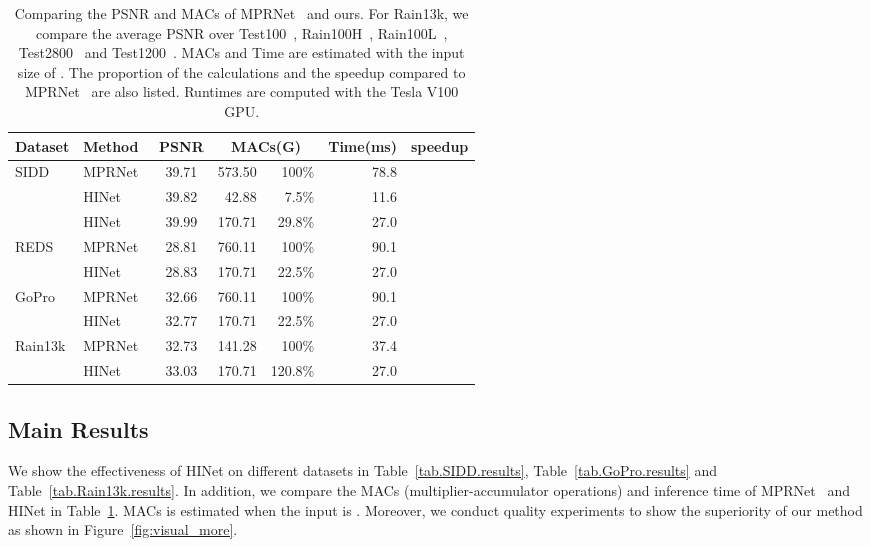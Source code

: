 \documentclass[final]{cvpr}
\newcommand{\tablestyle}[2]{\setlength{\tabcolsep}{#1}\renewcommand{\arraystretch}{#2}\centering\footnotesize}
\begin{document}
\begin{table}
\centering
\tablestyle{5pt}{1.05}\setlength{\tabcolsep}{1.mm}\begin{tabular}{l|l|c|rr|rr}
Dataset& Method & PSNR & \multicolumn{2}{c}{MACs(G)} &Time(ms)&speedup\\
\hline
\multirow{3}{4em}{SIDD~\cite{abdelhamed2018high}} & MPRNet~\cite{Zamir2021MPRNet} & 39.71 & 573.50&100\% & 78.8 & \\
&HINet &39.82&42.88&7.5\% & 11.6 & \\
&HINet &39.99&170.71&29.8\% & 27.0& \\
\hline
\multirow{2}{4em}{REDS~\cite{nah2019ntire}} & MPRNet~\cite{Zamir2021MPRNet} & 28.81 & 760.11&100\% & 90.1& \\
&HINet  &28.83&170.71&22.5\% & 27.0 & \\
\hline
\multirow{2}{4em}{GoPro~\cite{nah2017deep}} & MPRNet~\cite{Zamir2021MPRNet} & 32.66 & 760.11&100\% & 90.1 &  \\
&HINet  &32.77&170.71&22.5\% & 27.0 & \\
\hline
\multirow{2}{4em}{Rain13k} & MPRNet~\cite{Zamir2021MPRNet} & 32.73 &141.28&100\% & 37.4 & \\
&HINet  &33.03&170.71&120.8\% & 27.0 & \\
\end{tabular}
\vspace{-.2cm}
\caption{Comparing the PSNR and MACs of MPRNet~\cite{Zamir2021MPRNet} and ours. For Rain13k, we compare the average PSNR over Test100~\cite{zhang2019image}, Rain100H~\cite{yang2017deep}, Rain100L~\cite{yang2017deep}, Test2800~\cite{fu2017removing} and Test1200~\cite{zhang2018density}. MACs and Time are estimated with the input size of . The proportion of the calculations and the speedup compared to MPRNet~\cite{Zamir2021MPRNet} are also listed. Runtimes are computed with the Tesla V100 GPU.}
\label{tab.GmacsCompare}
\vspace{-.3cm}
\end{table}




\subsection{Main Results}
We show the effectiveness of HINet on different datasets in Table~\ref{tab.SIDD.results}, Table~\ref{tab.GoPro.results} and Table~\ref{tab.Rain13k.results}. In addition, we compare the MACs (\ie multiplier-accumulator operations) and inference time of MPRNet~\cite{Zamir2021MPRNet} and HINet in Table~\ref{tab.GmacsCompare}. MACs is estimated when the input is . Moreover, we conduct quality experiments to show the superiority of our method as shown in Figure~\ref{fig:visual_more}.
\end{document}
